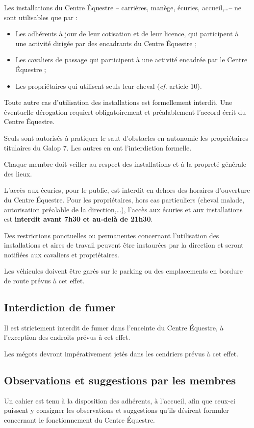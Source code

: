 \documentclass[11pt,a4paper]{article}
\begin{document}
Les installations du Centre Équestre -- carrières, manège, écuries, accueil,\dots -- ne sont utilisables que par :
\begin{itemize}[leftmargin=50pt]
\item
Les adhérents à jour de leur cotisation et de leur licence, qui participent à une activité dirigée par des encadrants du Centre Équestre ;
\item
Les cavaliers \og de passage \fg{} qui participent à une activité encadrée par le Centre Équestre ;
\item
Les propriétaires qui utilisent seuls leur cheval (\textit{cf.} article 10).
\end{itemize}

Toute autre cas d'utilisation des installations est formellement interdit.
Une éventuelle dérogation requiert obligatoirement et préalablement l'accord écrit du Centre Équestre.

Seuls sont autorisés à pratiquer le saut d'obstacles en autonomie les propriétaires titulaires du Galop 7.
Les autres en ont l'interdiction formelle.

Chaque membre doit veiller au respect des installations et à la propreté générale des lieux.

L'accès aux écuries, pour le public, est interdit en dehors des horaires d'ouverture du Centre Équestre.
Pour les propriétaires, hors cas particuliers (cheval malade, autorisation préalable de la direction,\dots), l'accès aux écuries et aux installations est \textbf{interdit avant 7h30 et au-delà de 21h30}.

Des restrictions ponctuelles ou permanentes concernant l'utilisation des installations et aires de travail peuvent être instaurées par la direction et seront notifiées aux cavaliers et propriétaires.

Les véhicules doivent être garés sur le parking ou des emplacements en bordure de route prévus à cet effet.

\subsection{Interdiction de fumer}
Il est strictement interdit de fumer dans l'enceinte du Centre Équestre, à l'exception des endroits prévus à cet effet.

Les mégots devront impérativement jetés dans les cendriers prévus à cet effet.

\subsection{Observations et suggestions par les membres}
Un cahier est tenu à la disposition des adhérents, à l'accueil, afin que ceux-ci puissent y consigner les observations et suggestions qu'ils désirent formuler concernant le fonctionnement du Centre Équestre.
\end{document}
